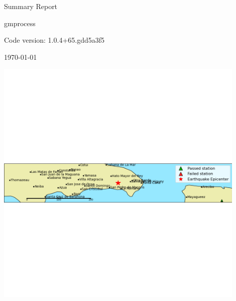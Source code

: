 \documentclass[9pt]{article}
\begin{document}
\begin{center}

\vfill

\large Summary Report

\vspace{1cm}

gmprocess

\vspace{1cm}

Code version: 1.0.4+65.gdd5a3f5

\vspace{1cm}

\today

\vspace{1cm}

\includegraphics[width=0.9\textwidth]
    {stations_map.png}



\end{center}
\end{document}

